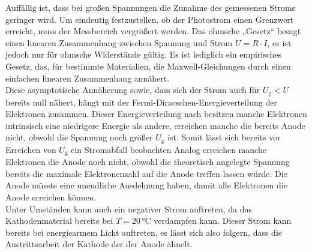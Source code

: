 Auffällig ist, dass bei großen Spannungen die Zunahme des gemessenen Stroms geringer wird. 
Um eindeutig festzustellen, ob der Photostrom einen Grenzwert erreicht, muss der Messbereich vergrößert werden.
Das ohmsche „Gesetz“ besagt einen linearen Zusammenhang zwischen Spannung und Strom $ U = R \cdot I $, es ist jedoch nur für ohmsche Widerstände gültig.  
Es ist lediglich ein empirisches Gesetz, das, für bestimmte Materialien, die Maxwell-Gleichungen durch einen einfachen linearen Zusammenhang annähert. \\

Diese asymptotische Annäherung sowie, dass sich der Strom auch für $U_\text{g} < U$ bereits null nähert, hängt mit der Fermi-Diracschen-Energieverteilung der Elektronen zusammen.
Dieser Energieverteilung nach besitzen manche Elektronen intrinsisch eine niedrigere Energie als andere, erreichen manche die bereits Anode nicht, obwohl die Spannung noch größer $U_\text{g}$ ist.
Somit lässt sich bereits vor Erreichen von $U_\text{g}$ ein Stromabfall beobachten
Analog erreichen manche Elektronen die Anode noch nicht, obwohl die theoretisch angelegte Spannung bereits die maximale Elektronenzahl auf die Anode treffen lassen würde. Die Anode müsste eine unendliche Ausdehnung haben, damit alle Elektronen die Anode erreichen können. \\

Unter Umständen kann auch ein negativer Strom auftreten, da das Kathodenmaterial bereits bei $T = 20 \,\si{\celsius}$ verdampfen kann.
Dieser Strom kann bereits bei energiearmem Licht auftreten, es lässt sich also folgern, dass die Austrittsarbeit der Kathode der der Anode ähnelt.


